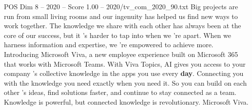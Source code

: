 \begin{textsample}{POS Dim 8 – 2020 – Score 1.00 – 2020/tv\_com\_2020\_90.txt}  \label{ex:f8_pos_030}
Big projects are run from small living rooms and our ingenuity has helped us find new ways to work together.
The knowledge we share with each other has always been at the core of our success, but it 's harder to tap into when we 're apart.
When we harness information and expertise, we 're empowered to achieve more.
Introducing Microsoft Viva, a new employee experience built on Microsoft 365 that works with Microsoft Teams.
With Viva Topics, AI gives you access to your company 's collective knowledge in the apps you use every \textbf{day}.
Connecting you with the knowledge you need exactly when you need it.
So you can build on each other 's ideas, find solutions faster, and continue to stay connected as a team.
Knowledge is powerful, but connected knowledge is revolutionary.
Microsoft Viva.

\end{textsample}
